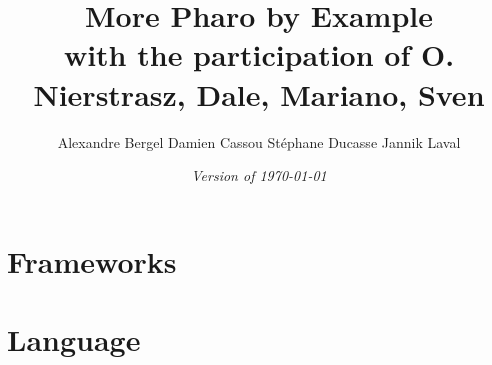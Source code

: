 \documentclass[a4paper,10pt,twoside]{book}
\begin{document}
\frontmatter
\setcounter{page}{1}
\pagestyle{headings}
\author{
	Alexandre Bergel\quad
	Damien Cassou\quad
	St\'ephane Ducasse\quad
	Jannik Laval\quad}
\title{\Huge\bf More Pharo by Example\\[1ex]
with the participation of O. Nierstrasz, Dale, Mariano, Sven }
\isodate
\date{\emph{Version of \today}}
\maketitle
\tableofcontents
\sloppy %
\mainmatter

%

% 


\part{Frameworks}












\part{Language}


\end{document}
